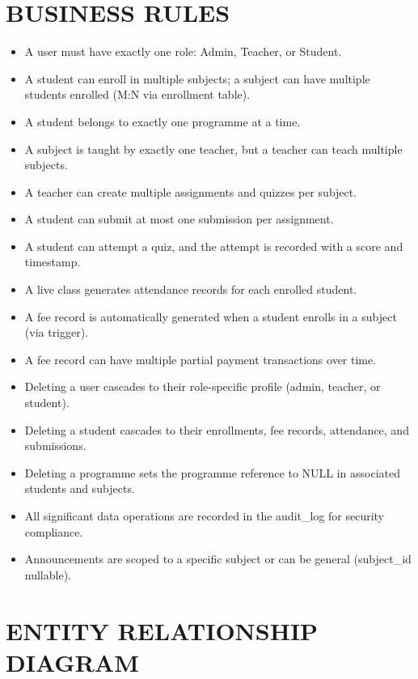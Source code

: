 \documentclass[12pt,a4paper]{report}
\begin{document}
\section{BUSINESS RULES}

\begin{itemize}[noitemsep]
    \item A user must have exactly one role: Admin, Teacher, or Student.
    \item A student can enroll in multiple subjects; a subject can have multiple students enrolled (M:N via enrollment table).
    \item A student belongs to exactly one programme at a time.
    \item A subject is taught by exactly one teacher, but a teacher can teach multiple subjects.
    \item A teacher can create multiple assignments and quizzes per subject.
    \item A student can submit at most one submission per assignment.
    \item A student can attempt a quiz, and the attempt is recorded with a score and timestamp.
    \item A live class generates attendance records for each enrolled student.
    \item A fee record is automatically generated when a student enrolls in a subject (via trigger).
    \item A fee record can have multiple partial payment transactions over time.
    \item Deleting a user cascades to their role-specific profile (admin, teacher, or student).
    \item Deleting a student cascades to their enrollments, fee records, attendance, and submissions.
    \item Deleting a programme sets the programme reference to NULL in associated students and subjects.
    \item All significant data operations are recorded in the audit\_log for security compliance.
    \item Announcements are scoped to a specific subject or can be general (subject\_id nullable).
\end{itemize}

\section{ENTITY RELATIONSHIP DIAGRAM}
\end{document}
